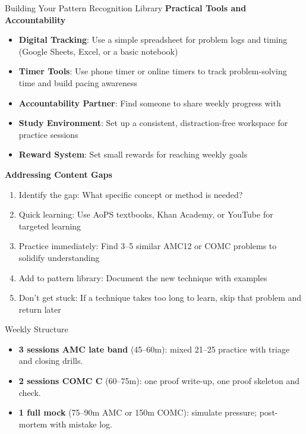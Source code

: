 \documentclass{article}
\begin{document}
\begin{trainingbox}{Building Your Pattern Recognition Library}
\textbf{Practical Tools and Accountability}
\begin{itemize}[nosep]
    \item \textbf{Digital Tracking}: Use a simple spreadsheet for problem logs and timing (Google Sheets, Excel, or a basic notebook)
    \item \textbf{Timer Tools}: Use phone timer or online timers to track problem-solving time and build pacing awareness
    \item \textbf{Accountability Partner}: Find someone to share weekly progress with
    \item \textbf{Study Environment}: Set up a consistent, distraction-free workspace for practice sessions
    \item \textbf{Reward System}: Set small rewards for reaching weekly goals
\end{itemize}

\textbf{Addressing Content Gaps}
\begin{enumerate}[nosep]
    \item Identify the gap: What specific concept or method is needed?
    \item Quick learning: Use AoPS textbooks, Khan Academy, or YouTube for targeted learning
    \item Practice immediately: Find 3--5 similar AMC12 or COMC problems to solidify understanding
    \item Add to pattern library: Document the new technique with examples
    \item Don't get stuck: If a technique takes too long to learn, skip that problem and return later
\end{enumerate}
\end{trainingbox}

\begin{trainingbox}{Weekly Structure}
\begin{itemize}
    \item \textbf{3 sessions AMC late band} (45--60m): mixed 21--25 practice with triage and closing drills.
    \item \textbf{2 sessions COMC C} (60--75m): one proof write-up, one proof skeleton and check.
    \item \textbf{1 full mock} (75--90m AMC or 150m COMC): simulate pressure; post-mortem with mistake log.
\end{itemize}
\end{trainingbox}
\end{document}
